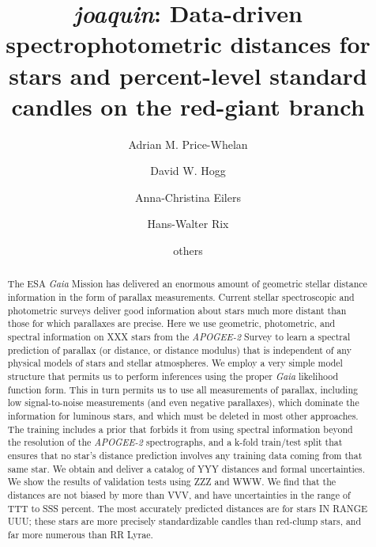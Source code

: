 \documentclass[modern]{aastex631}
\newcommand{\acronym}[1]{{\small{#1}}}
\newcommand{\project}[1]{\textsl{#1}}
\newcommand{\joaquin}{\project{joaquin}}
\newcommand{\ESA}{\acronym{ESA}}
\newcommand{\Gaia}{\project{Gaia}}
\newcommand{\APOGEE}{\project{\acronym{APOGEE-2}}}
\begin{document}
\title{\joaquin{}: Data-driven spectrophotometric distances for stars and
  percent-level standard candles on the red-giant branch}

\author{Adrian M. Price-Whelan}

\author[0000-0003-2866-9403]{David W. Hogg}

\author{Anna-Christina Eilers}

\author{Hans-Walter Rix}

\author{others}

\begin{abstract}\noindent
The \ESA{} \Gaia{} Mission has delivered an enormous amount of geometric stellar distance information in the form of parallax measurements.
Current stellar spectroscopic and photometric surveys deliver
good information about stars much more distant than those for which
parallaxes are precise.
Here we use geometric, photometric, and spectral information on XXX
stars from the \APOGEE{} Survey to learn a spectral prediction of
parallax (or distance, or distance modulus) that is independent of
any physical models of stars and stellar atmospheres.
We employ a very simple model structure that permits us to perform
inferences using the proper \Gaia{} likelihood function form.
This in turn permits us to use all measurements of parallax, including
low signal-to-noise measurements (and even negative parallaxes), which
dominate the information for luminous stars, and which must be deleted
in most other approaches.
The training includes a prior that forbids it from using spectral
information beyond the resolution of the \APOGEE{} spectrographs,
and a k-fold train/test split that ensures that no star's distance prediction
involves any training data coming from that same star.
We obtain and deliver a catalog of YYY distances and formal uncertainties.
We show the results of validation tests using ZZZ and WWW.
We find that the distances are not biased by more than VVV, and have uncertainties
in the range of TTT to SSS percent.
The most accurately predicted distances are for stars IN RANGE UUU; these stars
are more precisely standardizable candles than red-clump stars, and far more numerous
than RR Lyrae.
\end{abstract}
\end{document}
